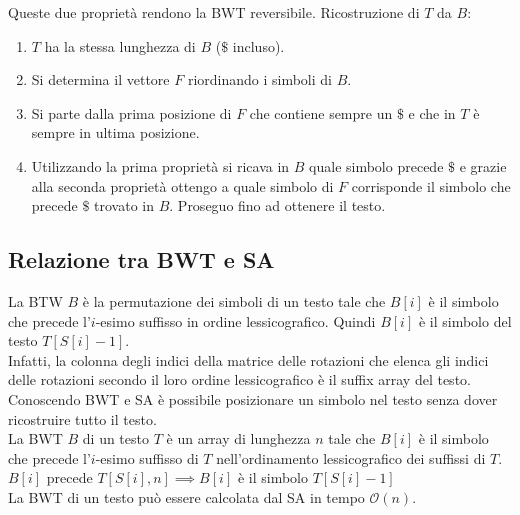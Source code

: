 Queste due proprietà rendono la BWT reversibile. Ricostruzione di $T$ da $B$:
\begin{enumerate}
    \item $T$ ha la stessa lunghezza di $B$ ($\$$ incluso).
    \item Si determina il vettore $F$ riordinando i simboli di $B$.
    \item Si parte dalla prima posizione di $F$ che contiene sempre un $\$$ e che in $T$ è sempre in ultima posizione.
    \item Utilizzando la prima proprietà si ricava in $B$ quale simbolo precede $\$$ e grazie alla seconda proprietà ottengo a quale simbolo di $F$ corrisponde il simbolo che precede $\$$ trovato in $B$. Proseguo fino ad ottenere il testo.
\end{enumerate}

\subsection{Relazione tra BWT e SA}
La BTW $B$ è la permutazione dei simboli di un testo tale che $B[i]$ è il simbolo che precede l’$i$-esimo suffisso in ordine lessicografico. Quindi $B[i]$ è il simbolo del testo $T[S[i]-1]$.\\
Infatti, la colonna degli indici della matrice delle rotazioni che elenca gli indici delle rotazioni secondo il loro ordine lessicografico è il suffix array del testo.\\

Conoscendo BWT e SA è possibile posizionare un simbolo nel testo senza dover ricostruire tutto il testo.\\

La BWT $B$ di un testo $T$ è un array di lunghezza $n$ tale che $B[i]$ è il simbolo che precede l’$i$-esimo suffisso di $T$ nell’ordinamento lessicografico dei suffissi di $T$. $B[i]$ precede $T[S[i],n] \implies B[i]$ è il simbolo $T[S[i]-1]$\\
La BWT di un testo può essere calcolata dal SA in tempo $\mathcal{O}(n)$.